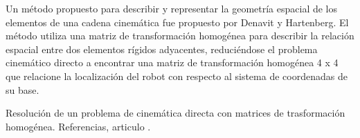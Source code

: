 \documentclass[10pt,a4paper]{article}
\begin{document}
Un método propuesto para describir y representar la geometría espacial de los elementos de una cadena cinemática fue propuesto por Denavit y Hartenberg. El método utiliza una matriz de transformación homogénea para describir la relación espacial entre dos elementos rígidos adyacentes, reduciéndose el problema cinemático directo a encontrar una matriz de transformación homogénea 4 x 4 que relacione la localización del robot con respecto al sistema de coordenadas de su base.

Resolución de un problema de cinemática directa con matrices de trasformación homogénea.
Referencias\cite{reyes2011robotica}, articulo
\cite{baturone2005robotica}.



\end{document}
